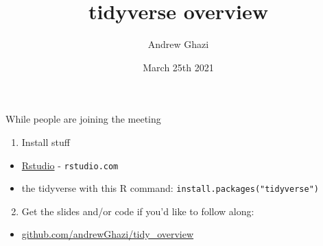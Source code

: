 \documentclass[
  ignorenonframetext,
]{beamer}
\title{tidyverse overview}
\author{Andrew Ghazi}
\date{March 25th 2021}
\providecommand{\tightlist}{%
  \setlength{\itemsep}{0pt}\setlength{\parskip}{0pt}}
\begin{document}
\frame{\titlepage}

\begin{frame}[fragile]{While people are joining the meeting}
\protect\hypertarget{while-people-are-joining-the-meeting}{}
\begin{enumerate}
\tightlist
\item
  Install stuff
\end{enumerate}

\begin{itemize}
\tightlist
\item
  \href{rstudio.com}{Rstudio} - \texttt{rstudio.com}
\item
  the tidyverse with this R command:
  \texttt{install.packages("tidyverse")}
\end{itemize}

\begin{enumerate}
\setcounter{enumi}{1}
\tightlist
\item
  Get the slides and/or code if you'd like to follow along:
\end{enumerate}

\begin{itemize}
\tightlist
\item
  \url{github.com/andrewGhazi/tidy_overview}
\end{itemize}
\end{frame}
\end{document}
